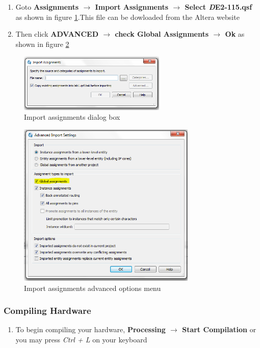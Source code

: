  \begin{enumerate}  
 
	\item Goto {\bf Assignments $\rightarrow$  Import Assignments $\rightarrow$  Select \emph DE2-115.qsf} as shown in figure \ref{fig:importassign}.This file can be dowloaded from the Altera website
	
	\item Then click {\bf ADVANCED $\rightarrow$ check Global Assignments $\rightarrow$ Ok} as shown in figure \ref{fig:advancedimport}

\end{enumerate}

\begin{figure}[H]
	\centering
	\includegraphics[width=70mm]{Lab1/figures/importassign.png}
	\caption{Import assignments dialog box}
	\label{fig:importassign}
\end{figure}

\begin{figure}[H]
	\centering
	\includegraphics[width=85mm]{Lab1/figures/advancedimport.png}
	\caption{Import assignments advanced options menu}
	\label{fig:advancedimport}
\end{figure}

\subsubsection{Compiling Hardware}

\begin{enumerate}

	\item To begin compiling your hardware, {\bf Processing $\rightarrow$ Start Compilation} or you may press \emph{Ctrl + L} on your keyboard

\end{enumerate}

